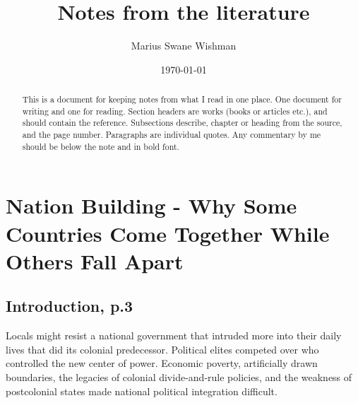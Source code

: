 \documentclass[12pt]{article}
\title{Notes from the literature}
\author[1]{Marius Swane Wishman}
\affil[1]{Department of Sociology and Political Science, NTNU}
\date{\today}
\begin{document}
\maketitle

\begin{abstract}
	This is a document for keeping notes from what I read in one
	place.  One document for writing and one for reading.  Section headers are works
	(books or articles etc.), and should contain the reference.  Subsections
	describe, chapter or heading from the source, and the page number.  Paragraphs
	are individual quotes.  Any commentary by me should be below the note and in
	bold font. 
\end{abstract}

\pagebreak

\onehalfspacing
\section{Nation Building - Why Some Countries Come Together While Others Fall 
	Apart \citep{Wimmer_2018}}

\subsection{Introduction, p.3}
Locals might resist a national government that intruded more into their daily
lives that did its colonial predecessor.  Political elites competed over who
controlled the new center of power.
Economic poverty, artificially drawn boundaries, the legacies of colonial
divide-and-rule policies, and the weakness of postcolonial states made national
political integration difficult.
\end{document}
